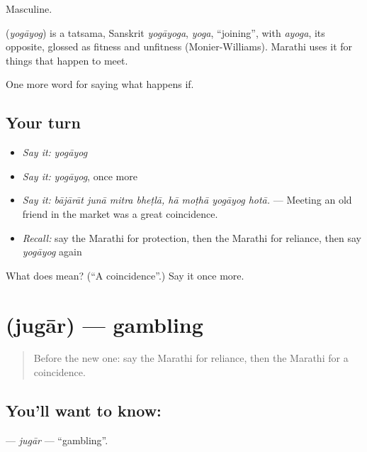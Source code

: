 Masculine.

\begin{cousinweb}
\textbf{} (\emph{yogāyog}) is a tatsama, Sanskrit \emph{yogāyoga}, \emph{yoga}, \textquotedblleft{}joining\textquotedblright{}, with \emph{ayoga}, its opposite, glossed as fitness and unfitness (Monier-Williams). Marathi uses it for things that happen to meet.
\end{cousinweb}

\begin{grammarlens}[title={What you've built}]
One more word for saying what happens if.
\end{grammarlens}

\subsection*{Your turn}
\begin{itemize}
\raggedright
  \item \emph{Say it:} \emph{yogāyog}
  \item \emph{Say it:} \emph{yogāyog}, once more
  \item \emph{Say it:} \emph{bājārāt junā mitra bheṭlā, hā moṭhā yogāyog hotā.} — Meeting an old friend in the market was a great coincidence.
  \item \emph{Recall:} say the Marathi for protection, then the Marathi for reliance, then say \emph{yogāyog} again
\end{itemize}

\begin{tcolorbox}[breakable,colback=teal!4,colframe=teal!35!black,title={Before you move on}]
What does  mean? (\textquotedblleft{}A coincidence\textquotedblright{}.) Say it once more.
\end{tcolorbox}
\section[\texorpdfstring{\mr{जुगार} (jugār)}{जुगार (jugār)}]{ (jugār) — gambling}

\label{lesson:MR-C550-jugar}



\begin{quote}
Before the new one: say the Marathi for reliance, then the Marathi for a coincidence.
\end{quote}

\subsection*{You'll want to know: }
\textbf{} — \emph{jugār} — \textquotedblleft{}gambling\textquotedblright{}.

